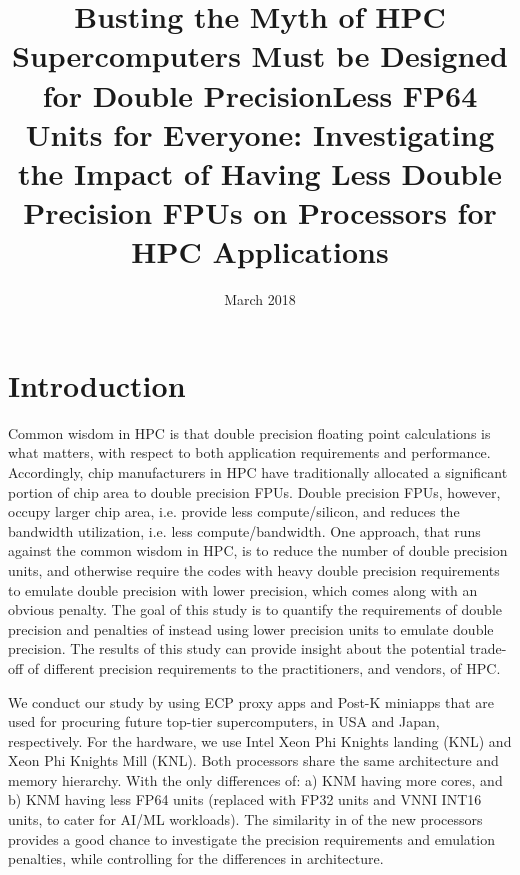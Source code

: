 \documentclass{article}
\title{Busting the Myth of HPC Supercomputers Must be Designed for Double Precision}
\title{Less FP64 Units for Everyone: Investigating the Impact of Having Less Double Precision FPUs on Processors for HPC Applications}
\author{}
\date{March 2018}
\begin{document}
\maketitle


\section{Introduction}

Common wisdom in HPC is that double precision floating point calculations is what matters, with respect to both application requirements and performance. Accordingly, chip manufacturers in HPC have traditionally allocated a significant portion of chip area to double precision FPUs. Double precision FPUs, however, occupy larger chip area, i.e. provide less compute/silicon, and reduces the bandwidth utilization, i.e. less compute/bandwidth. One approach, that runs against the common wisdom in HPC, is to reduce the number of double precision units, and otherwise require the codes with heavy double precision requirements to emulate double precision with lower precision, which comes along with an obvious penalty. The goal of this study is to quantify the requirements of double precision and penalties of instead using lower precision units to emulate double precision. The results of this study can provide insight about the potential trade-off of different precision requirements to the practitioners, and vendors, of HPC.

We conduct our study by using ECP proxy apps and Post-K miniapps that are used for procuring future top-tier supercomputers, in USA and Japan, respectively. For the hardware, we use Intel Xeon Phi Knights landing (KNL) and Xeon Phi Knights Mill (KNL). Both processors share the same architecture and memory hierarchy. With the only differences of: a) KNM having more cores, and b) KNM having less FP64 units (replaced with FP32 units and VNNI INT16 units, to cater for AI/ML workloads). The similarity in of the new processors provides a good chance to investigate the precision requirements and emulation penalties, while controlling for the differences in architecture.
\end{document}
